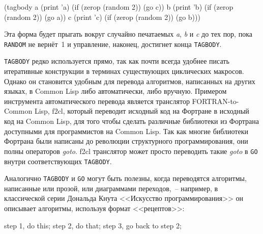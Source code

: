 \begin{myverb}
(tagbody
 a (print 'a) (if (zerop (random 2)) (go c))
 b (print 'b) (if (zerop (random 2)) (go a))
 c (print 'c) (if (zerop (random 2)) (go b)))
\end{myverb}

Эта форма будет прыгать вокруг случайно печатаемых \textit{a}, \textit{b} и \textit{c} до
тех пор, пока \lstinline{RANDOM} не вернёт~1 и управление, наконец, достигнет конца
\lstinline{TAGBODY}.

\lstinline{TAGBODY} редко используется прямо, так как почти всегда удобнее писать итеративные
конструкции в терминах существующих циклических макросов. Однако он становится удобным для
перевода алгоритмов, написанных на других языках, в Common Lisp либо автоматически, либо
вручную. Примером инструмента автоматического перевода является транслятор
FORTRAN-to-Common Lisp, f2cl, который переводит исходный код на Фортране в исходный код
на Common Lisp, для того чтобы сделать различные библиотеки из Фортрана доступными для
программистов на Common Lisp. Так как многие библиотеки Фортрана были написаны до
революции структурного программирования, они полны операторов \textit{goto}. f2cl
транслятор может просто переводить такие \textit{goto} в \lstinline{GO} внутри соответствующих
\lstinline{TAGBODY}.

Аналогично \lstinline{TAGBODY} и \lstinline{GO} могут быть полезны, когда переводятся алгоритмы,
напи\-сан\-ные или прозой, или диаграммами переходов,~-- например, в классической серии
Дональда Кнута <<Искусство программирования>> он описывает алгоритмы, используя формат
<<рецептов>>: 

\begin{myverb}
step 1, do this; 
step 2, do that; 
step 3, go back to step 2;
\end{myverb}

